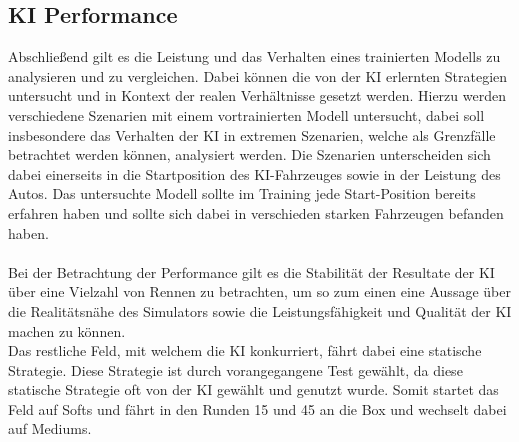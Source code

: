 \subsection{KI Performance}\label{sec:ai_performance}
Abschließend gilt es die Leistung und das Verhalten eines trainierten Modells zu analysieren und zu vergleichen. Dabei können die von der KI erlernten Strategien untersucht und in Kontext der realen Verhältnisse gesetzt werden. Hierzu werden verschiedene Szenarien mit einem vortrainierten Modell untersucht, dabei soll insbesondere das Verhalten der KI in extremen Szenarien, welche als Grenzfälle betrachtet werden können, analysiert werden. Die Szenarien unterscheiden sich dabei einerseits in die Startposition des KI-Fahrzeuges sowie in der Leistung des Autos. Das untersuchte Modell sollte im Training jede Start-Position bereits erfahren haben und sollte sich dabei in verschieden starken Fahrzeugen befanden haben.\\\\
Bei der Betrachtung der Performance gilt es die Stabilität der Resultate der KI über eine Vielzahl von Rennen zu betrachten, um so zum einen eine Aussage über die Realitätsnähe des Simulators sowie die Leistungsfähigkeit und Qualität der KI machen zu können.\\
Das restliche Feld, mit welchem die KI konkurriert, fährt dabei eine statische Strategie. Diese Strategie ist durch vorangegangene Test gewählt, da diese statische Strategie oft von der KI gewählt und genutzt wurde. Somit startet das Feld auf Softs und fährt in den Runden 15 und 45 an die Box und wechselt dabei auf Mediums. 

